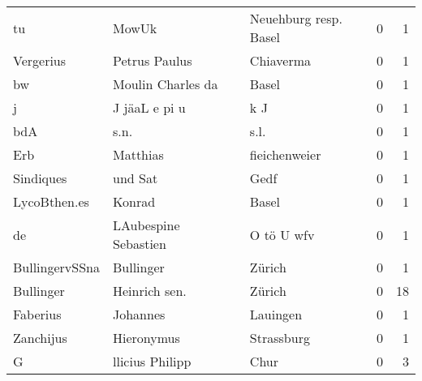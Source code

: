 \begin{center}
\begin{tiny}
\begin{longtabu}{llllrr}
                       tu &                              MowUk &             &                       Neuehburg resp. Basel &          0 &         1 \\
                Vergerius &                      Petrus Paulus &             &                                   Chiaverma &          0 &         1 \\
                       bw &                  Moulin Charles da &             &                                       Basel &          0 &         1 \\
                        j &                      J jäaL e pi u &             &                                         k J &          0 &         1 \\
                      bdA &                               s.n. &             &                                        s.l. &          0 &         1 \\
                      Erb &                           Matthias &             &                               fieichenweier &          0 &         1 \\
                Sindiques &                            und Sat &             &                                        Gedf &          0 &         1 \\
             LycoBthen.es &                             Konrad &             &                                       Basel &          0 &         1 \\
                       de &               LAubespine Sebastien &             &                                  O tö U wfv &          0 &         1 \\
           BullingervSSna &                          Bullinger &             &                                      Zürich &          0 &         1 \\
                Bullinger &                      Heinrich sen. &             &                                      Zürich &          0 &        18 \\
                 Faberius &                           Johannes &             &                                    Lauingen &          0 &         1 \\
                Zanchijus &                         Hieronymus &             &                                  Strassburg &          0 &         1 \\
                        G &                    llicius Philipp &             &                                        Chur &          0 &         3 \\

\end{longtabu}
\end{tiny}
\end{center}
